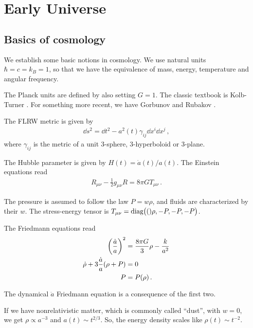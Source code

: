 \documentclass[main.tex]{subfiles}
\begin{document}
\chapter{Early Universe}

\section{Basics of cosmology}


We establish some basic notions in cosmology. We use natural units \(\hbar = c = k_B = 1\), so that we have the equivalence of mass, energy, temperature and angular frequency. 

The Planck units are defined by also setting \(G =1\).
The classic textbook is Kolb-Turner \cite[]{kolbEarlyUniverse1994}.
For something more recent, we have Gorbunov and Rubakov \cite[]{gorbunovIntroductionTheoryEarly2011}.

The FLRW metric is given by 
%
\begin{align}
\dd{s^2} = \dd{t}^2  - a^2(t) \gamma_{ij} \dd{x^{i}} \dd{x^{j}}
\,,
\end{align}
%
where \(\gamma_{ij}\) is the metric of a unit 3-sphere, 3-hyperboloid or 3-plane.

The Hubble parameter is given by \(H(t) = \dot{a}(t) / a(t)\). The Einstein equations read 
%
\begin{align}
R_{\mu \nu } - \frac{1}{2} g_{\mu \nu } R= 8 \pi G T_{\mu \nu }
\,.
\end{align}

The pressure is assumed to follow the law \(P = w \rho \), and fluids are characterized by their \(w\). 
The stress-energy tensor is \(T_{\mu \nu } = \text{diag}\qty(()\rho , - P, -P, -P)\).

The Friedmann equations read 
%
\begin{align}
\qty( \frac{\dot{a}}{a})^2 &= \frac{8 \pi G}{3} \rho - \frac{k}{a^2}  \\
\dot{\rho} + 3 \frac{\dot{a}}{a}(\rho + P) &=0  \\
P &= P(\rho ) 
\,.
\end{align}

The dynamical \(\ddot{a}\) Friedmann equation is a consequence of the first two. 

If we have nonrelativistic matter, which is commonly called ``dust'', with \(w = 0\), we get \(\rho \propto a^{-3}\) and \(a(t) \sim t^{2/3}\).
So, the energy density scales like \(\rho (t) \sim t^{-2}\). 
\end{document}
